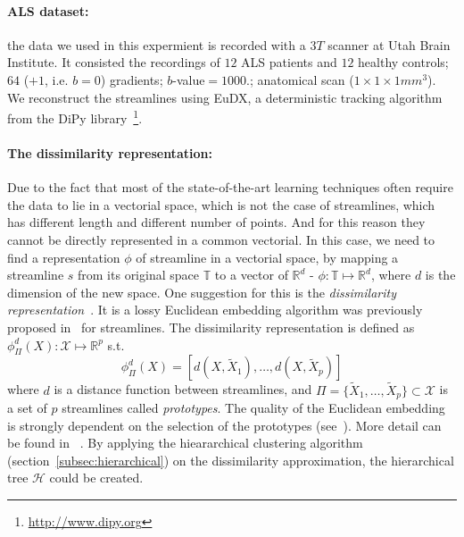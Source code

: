 \paragraph*{ALS dataset:}
the data we used in this expermient is recorded with a $3T$ scanner at Utah Brain Institute. It
consisted the recordings of $12$ ALS patients and $12$ healthy
controls; $64$ ($+1$, i.e. $b=0$) gradients; $b$-value$=1000$.;
anatomical scan ($1 \times 1 \times 1mm^3$).  We reconstruct the
streamlines using EuDX, a deterministic tracking algorithm
~\cite{garyfallidis2012towards} from the DiPy
library~\footnote{\url{http://www.dipy.org}}. %
\paragraph*{The dissimilarity representation: }
Due to the fact that most of the state-of-the-art learning techniques often require the data to lie in a vectorial space, which is not the case of streamlines, which has different length and different number of points. And for this reason they cannot be directly represented in a common vectorial. In this case, we need to find a representation $\phi$ of streamline in a vectorial space, by mapping a streamline $s$ from its original space $\mathbb{T}$ to a vector of $\mathbb{R}^d$ - $\phi : \mathbb{T} \mapsto \mathbb{R}^d$, where $d$ is the dimension of the new space. One suggestion for this is the \emph{dissimilarity representation}~\cite{pekalska2002generalized}. It is a lossy Euclidean embedding algorithm was previously proposed
in~\cite{olivetti2012approximation} for streamlines. The dissimilarity representation
is defined as $\phi_{\Pi}^d(X):\mathcal{X} \mapsto \mathbb{R}^p$ s.t.
\begin{equation}
  \phi_{\Pi}^d(X) = [d(X,\tilde{X}_1) ,\ldots, d(X,\tilde{X}_p)]
\label{equ:dissimilarity_representation}
\end{equation}
where $d$ is a distance function between streamlines, and $\Pi =
\{\tilde{X}_1, \ldots, \tilde{X}_p\} \subset \mathcal{X}$ is a set of
$p$ streamlines called \emph{prototypes}. The quality of the Euclidean
embedding is strongly dependent on the selection of the prototypes
(see~\cite{pekalska2006prototype,olivetti2012approximation}). More detail can be found in ~\cite{olivetti2012approximation}.
By applying the hieararchical clustering algorithm (section~\ref{subsec:hierarchical}) on the dissimilarity approximation, the hierarchical tree $\mathcal{H}$ could be created.

